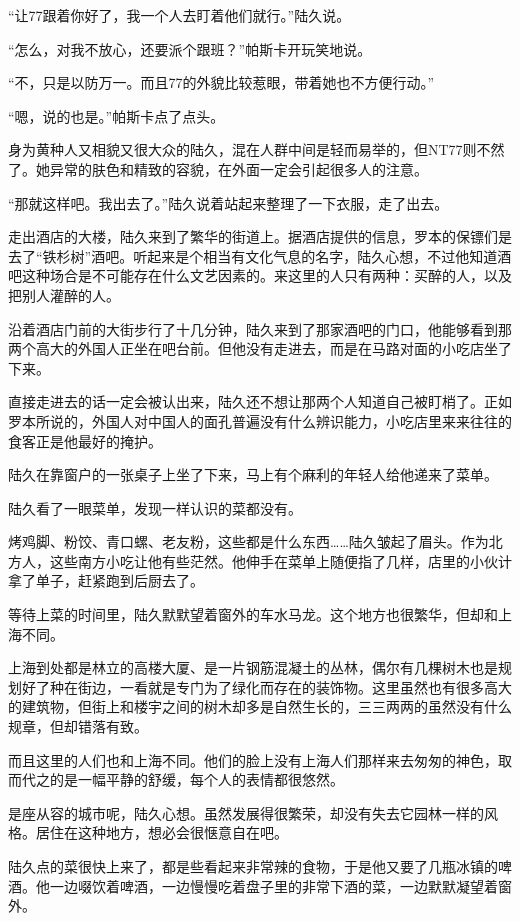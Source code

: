 “让77跟着你好了，我一个人去盯着他们就行。”陆久说。

“怎么，对我不放心，还要派个跟班？”帕斯卡开玩笑地说。

“不，只是以防万一。而且77的外貌比较惹眼，带着她也不方便行动。”

“嗯，说的也是。”帕斯卡点了点头。

身为黄种人又相貌又很大众的陆久，混在人群中间是轻而易举的，但NT77则不然了。她异常的肤色和精致的容貌，在外面一定会引起很多人的注意。

“那就这样吧。我出去了。”陆久说着站起来整理了一下衣服，走了出去。

走出酒店的大楼，陆久来到了繁华的街道上。据酒店提供的信息，罗本的保镖们是去了“铁杉树”酒吧。听起来是个相当有文化气息的名字，陆久心想，不过他知道酒吧这种场合是不可能存在什么文艺因素的。来这里的人只有两种：买醉的人，以及把别人灌醉的人。

沿着酒店门前的大街步行了十几分钟，陆久来到了那家酒吧的门口，他能够看到那两个高大的外国人正坐在吧台前。但他没有走进去，而是在马路对面的小吃店坐了下来。

直接走进去的话一定会被认出来，陆久还不想让那两个人知道自己被盯梢了。正如罗本所说的，外国人对中国人的面孔普遍没有什么辨识能力，小吃店里来来往往的食客正是他最好的掩护。

陆久在靠窗户的一张桌子上坐了下来，马上有个麻利的年轻人给他递来了菜单。

陆久看了一眼菜单，发现一样认识的菜都没有。

烤鸡脚、粉饺、青口螺、老友粉，这些都是什么东西……陆久皱起了眉头。作为北方人，这些南方小吃让他有些茫然。他伸手在菜单上随便指了几样，店里的小伙计拿了单子，赶紧跑到后厨去了。

等待上菜的时间里，陆久默默望着窗外的车水马龙。这个地方也很繁华，但却和上海不同。

上海到处都是林立的高楼大厦、是一片钢筋混凝土的丛林，偶尔有几棵树木也是规划好了种在街边，一看就是专门为了绿化而存在的装饰物。这里虽然也有很多高大的建筑物，但街上和楼宇之间的树木却多是自然生长的，三三两两的虽然没有什么规章，但却错落有致。

而且这里的人们也和上海不同。他们的脸上没有上海人们那样来去匆匆的神色，取而代之的是一幅平静的舒缓，每个人的表情都很悠然。

是座从容的城市呢，陆久心想。虽然发展得很繁荣，却没有失去它园林一样的风格。居住在这种地方，想必会很惬意自在吧。

陆久点的菜很快上来了，都是些看起来非常辣的食物，于是他又要了几瓶冰镇的啤酒。他一边啜饮着啤酒，一边慢慢吃着盘子里的非常下酒的菜，一边默默凝望着窗外。

